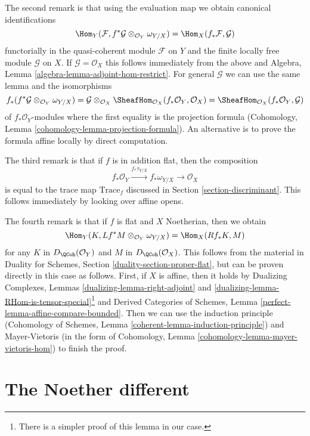 \medskip\noindent
The second remark is that using the evaluation map we obtain
canonical identifications
$$
\Hom_Y(\mathcal{F}, f^*\mathcal{G} \otimes_{\mathcal{O}_Y} \omega_{Y/X})
=
\Hom_X(f_*\mathcal{F}, \mathcal{G})
$$
functorially in the quasi-coherent module $\mathcal{F}$ on $Y$
and the finite locally free module $\mathcal{G}$ on $X$.
If $\mathcal{G} = \mathcal{O}_X$ this follows immediately
from the above and
Algebra, Lemma \ref{algebra-lemma-adjoint-hom-restrict}.
For general $\mathcal{G}$ we can use the same lemma and the
isomorphisms
$$
f_*(f^*\mathcal{G} \otimes_{\mathcal{O}_Y} \omega_{Y/X}) =
\mathcal{G} \otimes_{\mathcal{O}_X}
\SheafHom_{\mathcal{O}_X}(f_*\mathcal{O}_Y, \mathcal{O}_X) =
\SheafHom_{\mathcal{O}_X}(f_*\mathcal{O}_Y, \mathcal{G})
$$
of $f_*\mathcal{O}_Y$-modules where the first equality is the
projection formula
(Cohomology, Lemma \ref{cohomology-lemma-projection-formula}).
An alternative is to prove the formula affine locally by
direct computation.

\medskip\noindent
The third remark is that if $f$ is in addition flat, then the
composition
$$
f_*\mathcal{O}_Y \xrightarrow{f_*\tau_{Y/X}} f_*\omega_{Y/X}
\longrightarrow \mathcal{O}_X
$$
is equal to the trace map $\text{Trace}_f$ discussed in
Section \ref{section-discriminant}. This follows immediately by
looking over affine opens.

\medskip\noindent
The fourth remark is that if $f$ is flat and $X$ Noetherian, then
we obtain
$$
\Hom_Y(K, Lf^*M \otimes_{\mathcal{O}_Y} \omega_{Y/X})
=
\Hom_X(Rf_*K, M)
$$
for any $K$ in $D_\QCoh(\mathcal{O}_Y)$ and $M$ in $D_\QCoh(\mathcal{O}_X)$.
This follows from the material in
Duality for Schemes, Section \ref{duality-section-proper-flat},
but can be proven directly in this case as follows.
First, if $X$ is affine, then it holds by
Dualizing Complexes, Lemmas \ref{dualizing-lemma-right-adjoint} and
\ref{dualizing-lemma-RHom-is-tensor-special}\footnote{There is a
simpler proof of this lemma in our case.} and
Derived Categories of Schemes, Lemma \ref{perfect-lemma-affine-compare-bounded}.
Then we can use the induction principle
(Cohomology of Schemes, Lemma \ref{coherent-lemma-induction-principle})
and Mayer-Vietoris
(in the form of Cohomology, Lemma \ref{cohomology-lemma-mayer-vietoris-hom})
to finish the proof.







\section{The Noether different}
\label{section-noether-different}

